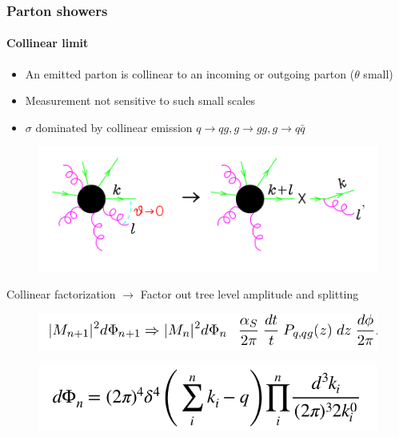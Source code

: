 \documentclass[aspectratio=43]{beamer}
\begin{document}
\begin{frame}

	\frametitle{Parton showers}
	\framesubtitle{Collinear limit}
	
	\begin{itemize} 
		\item \footnotesize An emitted parton is collinear to an incoming or outgoing parton ($\theta$ small)
		\item \footnotesize Measurement not sensitive to such small scales
		\item \footnotesize $\sigma$ dominated by collinear emission $q \rightarrow qg, g \rightarrow gg, g \rightarrow q\bar{q}$
	\end{itemize}
	
	\begin{figure}
		\includegraphics[width = 6.5 cm]{plots/collinear_factorization.png}
	\end{figure}
	
	\footnotesize Collinear factorization $\longrightarrow$ Factor out tree level amplitude and splitting
	\begin{figure}
		\includegraphics[width = 7 cm]{plots/eq_factorization_theorem.png}
	\end{figure}

	\begin{figure}
		\includegraphics[width = 5 cm]{plots/eq_factorization_ps.png}
	\end{figure}

\end{frame}
\end{document}

